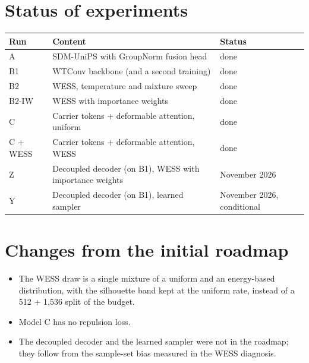 \documentclass[Main.tex]{subfiles}
\begin{document}
\section*{Status of experiments}
\begin{table}[H]
\centering
\begin{tabular}{lll}
\hline
\textbf{Run} & \textbf{Content} & \textbf{Status} \\
\hline
A        & SDM-UniPS with GroupNorm fusion head            & done \\
B1       & WTConv backbone (and a second training)         & done \\
B2       & WESS, temperature and mixture sweep             & done \\
B2-IW    & WESS with importance weights                    & done \\
C        & Carrier tokens + deformable attention, uniform  & done \\
C + WESS & Carrier tokens + deformable attention, WESS     & done \\
Z        & Decoupled decoder (on B1), WESS with importance weights & November 2026 \\
Y        & Decoupled decoder (on B1), learned sampler      & November 2026, conditional \\
\hline
\end{tabular}
\end{table}

\section*{Changes from the initial roadmap}
\begin{itemize}
  \item The WESS draw is a single mixture of a uniform and an energy-based distribution, with the
    silhouette band kept at the uniform rate, instead of a 512 + 1,536 split of the budget.
  \item Model C has no repulsion loss.
  \item The decoupled decoder and the learned sampler were not in the roadmap; they follow from the
    sample-set bias measured in the WESS diagnosis.
\end{itemize}
\end{document}
